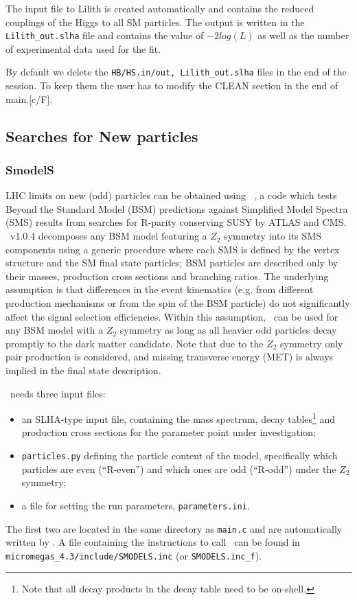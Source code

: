 \documentclass[12pt,a4paper]{article}
\begin{document}
{The input file  to Lilith is created automatically and contains the reduced couplings of the Higgs to all SM particles. The output is written in the \verb|Lilith_out.slha| file and contains the value of $-2 log(L)$ as well as the number of experimental data  used for the fit.

By default we delete the \verb|HB/HS.in/out, Lilith_out.slha|  files in the end of the session. 
To keep them the user has to modify the CLEAN section in the end of main.[c/F].

\subsection{Searches for New particles}

\subsubsection{SmodelS}
LHC limits on new (odd) particles can be obtained using \smodels~\cite{Kraml:2013mwa,Kraml:2014sna}, 
a code which tests Beyond the Standard Model (BSM) predictions against Simplified Model Spectra (SMS) results from searches 
for R-parity conserving SUSY by ATLAS and CMS.
\smodels~v1.0.4 decomposes any BSM model featuring a ${Z}_2$ symmetry into its SMS components 
using a generic procedure where each SMS is defined by the vertex structure and the SM final state particles; BSM particles are described only by their masses, production cross sections and branching ratios. 
The underlying assumption is that differences in the event kinematics (e.g. from different production mechanisms or from the spin of the BSM particle) do not significantly affect the signal selection efficiencies. 
Within this assumption, \smodels\ can be used for any BSM model with a ${Z}_2$ symmetry as long as all heavier odd particles decay promptly to the dark matter candidate. Note that due to the ${Z}_2$ symmetry only pair production is considered, and missing transverse energy (MET) is always implied in the final state description.

\smodels\ needs three input files:
%
\begin{itemize}
\item an SLHA-type input file,  
containing the mass
spectrum, decay tables\footnote{Note that all decay products in the decay table need to be on-shell.} and production cross sections for the parameter point under investigation;
\item {\tt particles.py} defining the particle content of the model, specifically which particles are even (``R-even'') 
and which ones are odd (``R-odd'') under the ${Z}_2$ symmetry;
\item a file for setting the run parameters, {\tt parameters.ini}.
\end{itemize}
%
The first two are located in the same directory as {\tt main.c} and 
are automatically written by \micro. A file containing the instructions to call  \smodels\ can be found in \verb|micromegas_4.3/include/SMODELS.inc| (or \verb|SMODELS.inc_f|).





}
\end{document}

